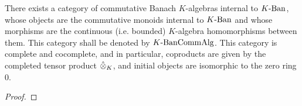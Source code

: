             \begin{corollary} \label{coro: commutative_non_archimedean_banach_algebras}
                There exists a category of commutative Banach $K$-algebras internal to $K\text{-}\mathrm{Ban}$, whose objects are the commutative monoids internal to $K\text{-}\mathrm{Ban}$ and whose morphisms are the continuous (i.e. bounded) $K$-algebra homomorphisms between them. This category shall be denoted by $K\text{-}\mathrm{Ban}\mathrm{Comm}\mathrm{Alg}$. This category is complete and cocomplete, and in particular, coproducts are given by the completed tensor product $\hattensor_K$, and initial objects are isomorphic to the zero ring $0$.
            \end{corollary}
                \begin{proof}
                    
                \end{proof}
            

